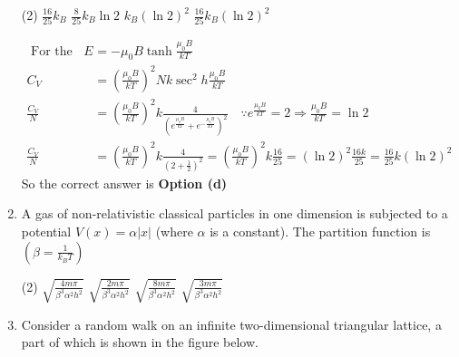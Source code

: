 \begin{enumerate}
 \begin{tasks}(2)
	\task[\textbf{a.}]$\frac{16}{25} k_{B}$
	\task[\textbf{b.}] $\frac{8}{25} k_{B} \ln 2$
	\task[\textbf{c.}]$k_{B}(\ln 2)^{2}$
	\task[\textbf{d.}]  $\frac{16}{25} k_{B}(\ln 2)^{2}$
\end{tasks}
\begin{answer}
	\begin{align*}
	\text {  For the given system } E&=-\mu_{0} B \tanh \frac{\mu_{0} B}{k T}\\
	C_{V}&=\left(\frac{\mu_{0} B}{k T}\right)^{2} N k \sec ^{2} h \frac{\mu_{0} B}{k T}\\
	\frac{C_{V}}{N}&=\left(\frac{\mu_{0} B}{k T}\right)^{2} k \frac{4}{\left(e^{\frac{\mu_{0} B}{k T}}+e^{-\frac{\mu_{0} B}{k T}}\right)^{2}} \quad \because e^{\frac{\mu_{0} B}{k T}}=2 \Rightarrow \frac{\mu_{0} B}{k T}=\ln 2\\
	\frac{C_{V}}{N}&=\left(\frac{\mu_{0} B}{k T}\right)^{2} k \frac{4}{\left(2+\frac{1}{2}\right)^{2}}=\left(\frac{\mu_{0} B}{k T}\right)^{2} k \frac{16}{25}=(\ln 2)^{2} \frac{16 k}{25}=\frac{16}{25} k(\ln 2)^{2}
	\end{align*}
	So the correct answer is \textbf{Option (d)}
\end{answer}
\item A gas of non-relativistic classical particles in one dimension is subjected to a potential $V(x)=\alpha|x|$ (where $\alpha$ is a constant). The partition function is $\left(\beta=\frac{1}{k_{B} T}\right)$
 \begin{tasks}(2)
	\task[\textbf{a.}] $\sqrt{\frac{4 m \pi}{\beta^{3} \alpha^{2} h^{2}}}$
	\task[\textbf{b.}] $\sqrt{\frac{2 m \pi}{\beta^{3} \alpha^{2} h^{2}}}$
	\task[\textbf{c.}]$\sqrt{\frac{8 m \pi}{\beta^{3} \alpha^{2} h^{2}}}$
	\task[\textbf{d.}] $\sqrt{\frac{3 m \pi}{\beta^{3} \alpha^{2} h^{2}}}$
\end{tasks}
\item Consider a random walk on an infinite two-dimensional triangular lattice, a part of which is shown in the figure below.


\end{enumerate}
